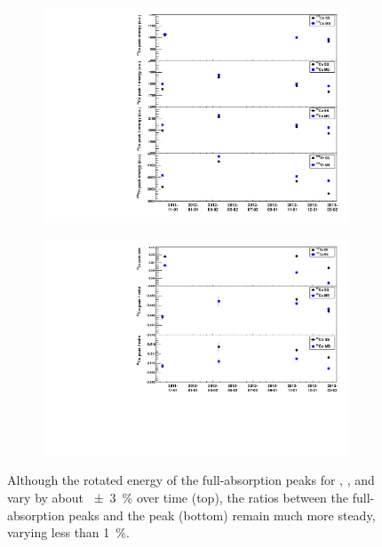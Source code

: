 \documentclass[herrin-thesis.tex]{subfiles}
\begin{document}
\begin{figure}[tbp]
\centering
\begin{subfigure}[b]{0.75\textwidth}
\centering
\includegraphics[width=\textwidth]{./plots/data_peak_energy_v_time.pdf}
\end{subfigure}
\begin{subfigure}[b]{0.75\textwidth}
\centering
\includegraphics[width=1\textwidth]{./plots/data_peak_ratio_v_time.pdf}
\end{subfigure}
\caption[Variation of full-absorption peak energies and peak energy ratios over time]{Although the rotated energy of the full-absorption peaks for , , and  vary by about \SI{\pm3}{\percent} over time (top), the ratios between the full-absorption peaks and the  peak (bottom) remain much more steady, varying less than \SI{1}{\percent}.}
\label{fig:data_energy_ratios_time}
\end{figure}
\end{document}

